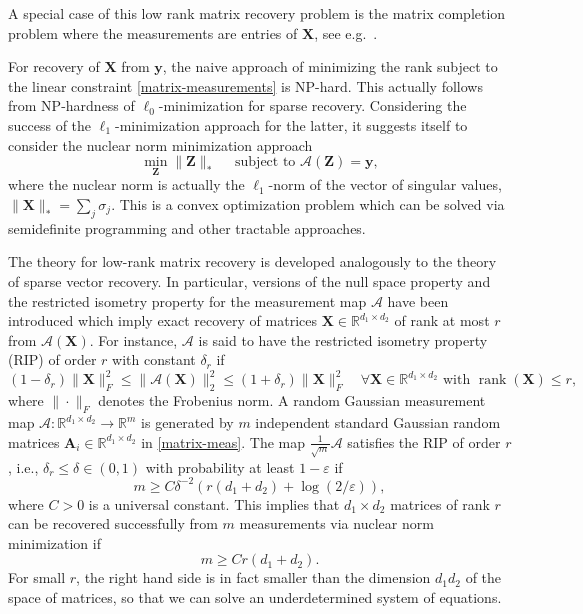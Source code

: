 \documentclass{svproc}
\newcommand{\corr}[1]{#1}
\newcommand{\bA}{\boldsymbol{A}}
\newcommand{\bX}{\boldsymbol{X}}
\newcommand{\by}{\boldsymbol{y}}
\newcommand{\bZ}{\boldsymbol{Z}}
\newcommand{\0}{\boldsymbol{0}}
\newcommand{\1}{\boldsymbol{1}}
\renewcommand{\epsilon}{\varepsilon}
\def\R{\mathbb{R}}
\begin{document}
A special case of this low rank matrix recovery problem is the matrix completion problem where the measurements are entries of $\bX$, see e.g.\ \cite{candes2009exact,recht2011simpler,gross2011recovering}.

For recovery of $\bX$ from $\by$, the naive approach of minimizing the rank subject to the linear constraint \eqref{matrix-measurements} is NP-hard. This actually follows from NP-hardness of $\ell_0$-minimization for sparse recovery.
Considering the success of the $\ell_1$-minimization approach for the latter, it suggests itself to consider 
the nuclear norm minimization approach
\[
\min_{\bZ} \|\bZ\|_* \quad \mbox{ subject to } \mathcal{A}(\bZ) = \by,
\]
where the nuclear norm is actually the $\ell_1$-norm of the vector of singular values, $\|\bX\|_* = \sum_{j} \sigma_j$. This is a convex optimization problem which can be solved via semidefinite programming and other tractable approaches.

The theory for \corr{low-rank} matrix recovery is developed analogously to the theory of sparse vector recovery. In particular, versions of the null space property and the restricted isometry property for the measurement map $\mathcal{A}$ have been introduced which imply exact recovery of matrices $\bX \in \R^{d_1 \times d_2}$ of rank at most $r$ from \corr{$\mathcal{A}(\bX)$}. For instance, $\mathcal{A}$ is said to have the restricted isometry property (RIP) of order $r$ with constant \corr{$\delta_r$} if
\begin{equation}\label{matrix-RIP}
(1-\delta_r) \|\bX\|_F^2 \leq \|\mathcal{A}(\bX)\|_2^2 \leq (1+\delta_r) \|\bX\|_F^2 \quad %
\forall \bX \in \R^{d_1 \times d_2} \mbox{ with } \operatorname{rank}(\corr{\bX}) \leq r,
\end{equation}
where $\|\cdot\|_F$ denotes the Frobenius norm. 
A random Gaussian measurement map $\mathcal{A} : \R^{d_1 \times d_2} \to \R^m$ is generated by $m$ independent standard Gaussian random matrices $\bA_i \in \R^{d_1 \times d_2}$ in \eqref{matrix-meas}. 
The map $\frac{1}{\sqrt{m}} \mathcal{A}$ satisfies the RIP of order $r$, i.e., $\delta_r \leq \delta \in (0,1)$ with probability at least $1-\epsilon$ if \cite{candes2011tight,recht2010guaranteed}
\begin{equation}\label{cond:m:RIP-matrix}
m \geq C \delta^{-2}(r(d_1+d_2) + \log(2/\varepsilon)),
\end{equation}
where $C>0$ is a universal constant.
This implies that $d_1 \times d_2$ matrices of rank $r$ can be recovered successfully from $m$ measurements via nuclear norm minimization if
\begin{equation}\label{m-lowrank-Gaussian}
m \geq C r(d_1+d_2).
\end{equation}
For small $r$, the right hand side is in fact smaller than the dimension $d_1d_2$ of the space of matrices, so that we can solve an underdetermined system of equations.
\end{document}
